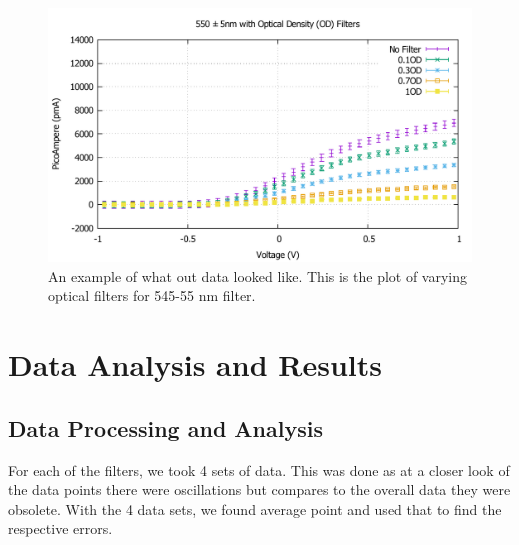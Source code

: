 \documentclass[11pt,letterpaper,onecolumn]{article}
\begin{document}
 \begin{figure}[H]
 \begin{center}
 \includegraphics*[scale = .6]{ODplot.pdf}
 \caption{An example of what out data looked like. This is the plot of varying optical filters for 545-55 nm filter.\label{fig:OD} }
 \end{center}
\end{figure}
 
 


\section{Data Analysis and Results}

\subsection{Data Processing and Analysis}

For each of the filters, we took 4 sets of data. This was done as at a closer look of the data points there were oscillations but compares to the overall data they were obsolete. With the 4 data sets, we found average point and used that to find the respective errors.   
\end{document}
